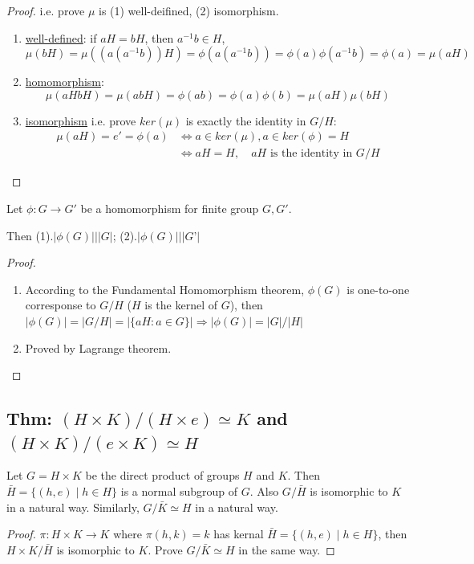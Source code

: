 \documentclass[11pt]{elegantbook}
\begin{document}
\begin{proof}
i.e. prove $\mu$ is (1) well-deifined, (2) isomorphism.
\begin{enumerate}[(1)]
    \item \underline{well-defined}: if $aH=bH$, then $a^{-1}b\in H$, $$\mu(bH)=\mu((a(a^{-1}b))H)=\phi(a(a^{-1}b))=\phi(a)\phi(a^{-1}b)=\phi(a)=\mu(aH)$$
    \item \underline{homomorphism}:$$\mu(aHbH)=\mu(abH)=\phi(ab)=\phi(a)\phi(b)=\mu(aH)\mu(bH)$$
    \item \underline{isomorphism} i.e. prove $ker(\mu)$ is exactly the identity in $G/H$:
    \begin{equation}
        \begin{aligned}
            \mu(aH)=e'=\phi(a) & \Leftrightarrow a\in ker(\mu),a\in ker(\phi)=H\\
            &\Leftrightarrow aH=H,\quad aH\text{ is the identity in }G/H
        \end{aligned}
        \nonumber
    \end{equation}
\end{enumerate}
\end{proof}

\begin{corollary}
Let $\phi: G \rightarrow G'$ be a homomorphism for finite group $G,G'$.

Then (1).$|\phi(G)|\bigg|  |G|$; (2).$|\phi(G)|\bigg|  |G’|$
\end{corollary}
\begin{proof}
\quad
\begin{enumerate}[(1)]
    \item According to the Fundamental Homomorphism theorem, $\phi(G)$ is one-to-one corresponse to $G/H$ ($H$ is the kernel of $G$), then $|\phi(G)|=|G/H|=|\{aH: a\in G\}| \Rightarrow|\phi(G)|=|G|/|H|$
    \item Proved by Lagrange theorem.
\end{enumerate}
\end{proof}

\subsection{Thm: $(H\times K)/(H\times e)\simeq K$ and $(H\times K)/(e\times K)\simeq H$}
\begin{theorem}
    Let $G=H \times K$ be the direct product of groups $H$ and $K$. Then $\bar{H}=\{(h, e) \mid h \in H\}$ is a normal subgroup of $G$. Also $G / \bar{H}$ is isomorphic to $K$ in a natural way. Similarly, $G / \bar{K} \simeq H$ in a natural way.
\end{theorem}
\begin{proof}
    $\pi:H\times K \rightarrow	K$ where $\pi(h,k)=k$ has kernal $\bar{H}=\{(h, e) \mid h \in H\}$, then $H\times K/\bar{H}$ is isomorphic to $K$. Prove $G / \bar{K} \simeq H$ in the same way.
\end{proof}
\end{document}
